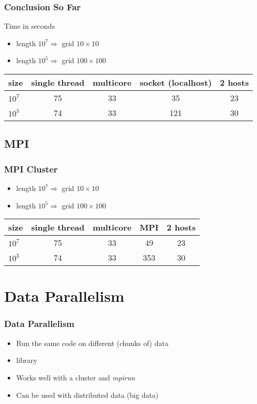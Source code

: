 \documentclass[pdftex]{beamer}
\begin{document}
\begin{frame}
  \frametitle{Conclusion So Far}
  Time in seconds
  \begin{itemize}
  \item length $10^{7} \Rightarrow$ grid $10\times10$
  \item length $10^{5} \Rightarrow$ grid $100\times100$
  \end{itemize}
  \begin{tabular}{l cccc}
    \toprule
    size      & single thread & multicore & socket (localhost) & 2 hosts\\
    \midrule
    $10^{7}$  & 75            & 33        & 35                 & 23\\
    $10^{5}$  & 74            & 33        & 121                & 30\\
    \bottomrule
  \end{tabular}
\end{frame}



\subsection{MPI}

\begin{frame}
  \frametitle{MPI Cluster}
  \begin{itemize}
  \item length $10^{7} \Rightarrow$ grid $10\times10$
  \item length $10^{5} \Rightarrow$ grid $100\times100$
  \end{itemize}
  \begin{tabular}{l cccc}
    \toprule
    size      & single thread & multicore & MPI & 2 hosts\\
    \midrule
    $10^{7}$  & 75            & 33        & 49                 & 23\\
    $10^{5}$  & 74            & 33        & 353                & 30\\
    \bottomrule
  \end{tabular}
\end{frame}

\section{Data Parallelism}

\begin{frame}
  \frametitle{Data Parallelism}
  \begin{itemize}
  \item Run the same code on different (chunks of) data
  \item {} library
  \item Works well with a cluster and \emph{mpirun}
  \item Can be used with distributed data (big data)
  \end{itemize}
\end{frame}
\end{document}
